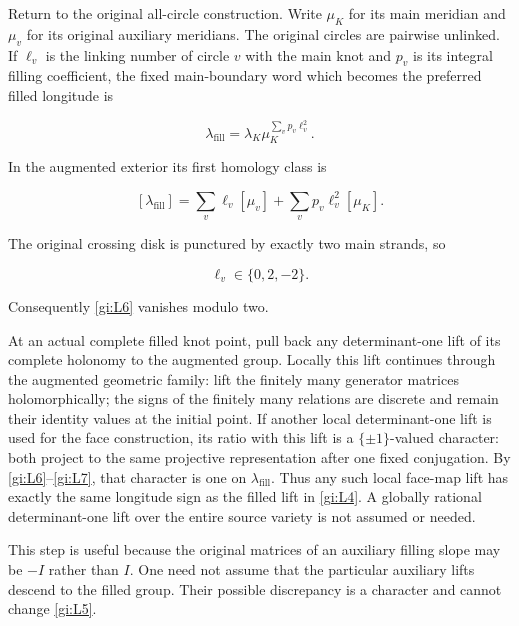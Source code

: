 Return to the original all-circle construction. Write
\(\mu_K\) for its main meridian and \(\mu_v\) for its
original auxiliary meridians. The original circles are pairwise
unlinked. If \(\ell_v\) is the linking number of circle
\(v\) with the main knot and \(p_v\) is its integral
filling coefficient, the fixed main-boundary word which becomes
the preferred filled longitude is

\begin{equation}\label{gi:L5}
\lambda_{\mathrm{fill}}
       =\lambda_K\mu_K^{\sum_vp_v\ell_v^2}.
\end{equation}

In the augmented exterior its first homology class is

\begin{equation}\label{gi:L6}
[\lambda_{\mathrm{fill}}]
      =\sum_v\ell_v[\mu_v]
           +\sum_vp_v\ell_v^2[\mu_K].
\end{equation}

The original crossing disk is punctured by exactly two main
strands, so

\begin{equation}\label{gi:L7}
\ell_v\in\{0,2,-2\}.
\end{equation}

Consequently \eqref{gi:L6} vanishes modulo two.

At an actual complete filled knot point, pull back any
determinant-one lift of its complete holonomy to the augmented
group. Locally this lift continues through the augmented geometric
family: lift the finitely many generator matrices holomorphically;
the signs of the finitely many relations are discrete and remain
their identity values at the initial point.
If another local determinant-one lift is used for the face
construction, its ratio with this lift is a
\(\{\pm1\}\)-valued character: both project to the same
projective representation after one fixed conjugation.
By \eqref{gi:L6}--\eqref{gi:L7}, that character is one on
\(\lambda_{\mathrm{fill}}\).
Thus any such local face-map lift has exactly the same longitude
sign as the filled lift in \eqref{gi:L4}. A globally rational
determinant-one lift over the entire source variety is not
assumed or needed.

This step is useful because the original matrices of an auxiliary
filling slope may be \(-I\) rather than \(I\). One need not
assume that the particular auxiliary lifts descend to the filled
group. Their possible discrepancy is a character and cannot
change \eqref{gi:L5}.

